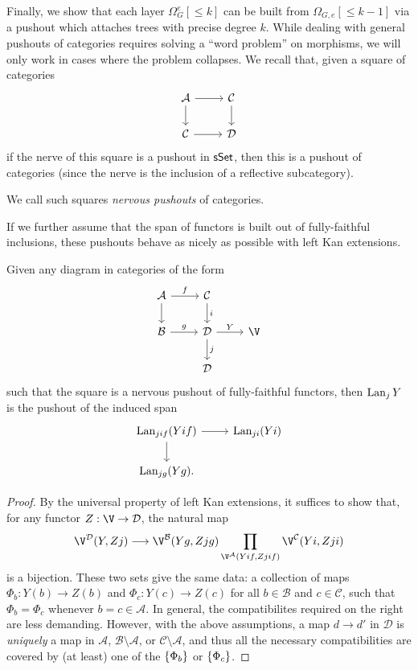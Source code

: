 \documentclass[a4paper,10pt]{article}%
\begin{document}
Finally, we show that each layer $\Omega_G^e[\leq k]$ can be built from $\Omega_{G,e}[\leq k-1]$ via a pushout which attaches trees with precise degree $k$. 
While dealing with general pushouts of categories requires solving a ``word problem'' on morphisms, we will only work in cases where the problem collapses. We recall that, given a square of categories
\[
\begin{tikzcd}
  \mathcal A \arrow[d] \arrow[r] & \mathcal C \arrow[d]\\
  \mathcal C \arrow[r] & \mathcal D
\end{tikzcd}
\]
if the nerve of this square is a pushout in $\mathsf{sSet}$, then this is a pushout of categories (since the nerve is the inclusion of a reflective subcategory).
\begin{definition}
  \label{NERVOUS_PUSHOUTS_DEFN}
  We call such squares \textit{nervous pushouts} of categories.
\end{definition}

If we further assume that the span of functors is built out of fully-faithful inclusions, these pushouts behave as nicely as possible with left Kan extensions.
\begin{lemma}
  \label{LAN_PUSHOUT_LEMMA}
  Given any diagram in categories of the form 
\[
\begin{tikzcd}
  \mathcal A \arrow[d] \arrow[r, "f"] & \mathcal C \arrow[d, "i"]\\
  \mathcal B \arrow[r, "g"] & \mathcal D \arrow[r, "Y"] \arrow[d, "j"] & \V \\
  & \mathcal D
\end{tikzcd}
\]
such that the square is a nervous pushout of fully-faithful functors, then $\operatorname{Lan}_j Y$ is the pushout of the induced span
\[
\begin{tikzcd}
  \Lan_{j i f}(Y i f) \arrow[r] \arrow[d] & \Lan_{j i}(Y i)\\
  \Lan_{j g}(Y g).
\end{tikzcd}
\]
\end{lemma}
\begin{proof}
  By the universal property of left Kan extensions, it suffices to show that, for any functor $Z: \V \to \D$, the natural map
  \[
  \V^\D(Y, Z j) \longto \V^{\mathcal B} (Y g, Z j g) \prod\limits_{\V^{\mathcal A}(Y i f, Z j i f)} \V^{\mathcal C}(Y i, Z j i)
  \]
  is a bijection. These two sets give the same data: a collection of maps $\Phi_b: Y(b) \to Z(b)$ and $\Phi_c:Y(c) \to Z(c)$ for all $b\in \mathcal B$ and $c \in \mathcal C$, such that $\Phi_b = \Phi_c$ whenever $b = c \in \mathcal A$. In general, the compatibilites required on the right are less demanding. However, with the above assumptions, a map $d \to d'$ in $\mathcal D$ is \textit{uniquely} a map in $\mathcal A$, $\mathcal B \setminus \mathcal A$, or $\mathcal C \setminus \mathcal A$, and thus all the necessary compatibilities are covered by (at least) one of the $\left\{\Phi_b\right\}$ or $\left\{\Phi_c\right\}$. 
\end{proof}
\end{document}
